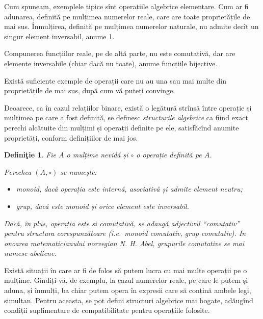 \documentclass[11pt,a4paper]{article}
\newcommand\qq{\enquote}
\theoremstyle{dotless}
\theoremstyle{dotlessdr}
\newtheorem{definition}{Defini\c{t}ie}[section]
\begin{document}
Cum spuneam, exemplele tipice sînt operațiile algebrice elementare. Cum ar fi adunarea, definită
pe mulțimea numerelor reale, care are toate proprietățile de mai sus. Înmulțirea, definită pe
mulțimea numerelor naturale, nu admite decît un singur element inversabil, anume 1.

Compunerea funcțiilor reale, pe de altă parte, nu este comutativă, dar are elemente inversabile
(chiar dacă nu toate), anume funcțiile bijective. 

Există suficiente exemple de operații care nu au una sau mai multe din proprietățile de mai sus,
după cum vă puteți convinge.

\vspace{1cm}

Deoarece, ca în cazul relațiilor binare, există o legătură strînsă între operație și mulțimea
pe care a fost definită, se definesc \emph{structurile algebrice} ca fiind exact perechi
alcătuite din mulțimi și operații definite pe ele, satisfăcînd anumite proprietăți,
conform definițiilor de mai jos.

\begin{definition}\label{def:str-alg}
  Fie $A$ o mulțime nevidă și $\circ$ o operație definită pe $A$.

  Perechea $(A, \circ)$ se numește:
  \begin{itemize}
    \item \emph{monoid}, dacă operația este internă, asociativă și admite element neutru;
    \item \emph{grup}, dacă este monoid și orice element este inversabil.
  \end{itemize}

  Dacă, în plus, operația este și comutativă, se adaugă adjectivul \qq{comutativ} pentru
  structura corespunzătoare (i.e.\ monoid comutativ, grup comutativ). În onoarea
  matematicianului norvegian N. H. Abel, grupurile comutative se mai numesc \emph{abeliene}.
\end{definition}

Există situații în care ar fi de folos să putem lucra cu mai multe operații pe o mulțime.
Gîndiți-vă, de exemplu, la cazul numerelor reale, pe care le putem și aduna, și înmulți, ba
chiar putem opera în expresii care să conțină ambele legi, simultan.
Pentru aceasta, se pot defini structuri algebrice mai bogate, adăugînd condiții suplimentare
de compatibilitate pentru operațiile folosite.
\end{document}
